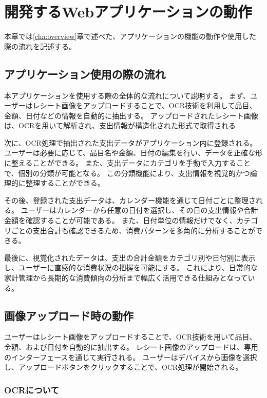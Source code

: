 \documentclass[main]{subfiles}
\begin{document}
\chapter{開発するWebアプリケーションの動作}
\label{cha:motion}
本章では\ref{cha:overview}章で述べた、アプリケーションの機能の動作や使用した際の流れを記述する。

\section{アプリケーション使用の際の流れ}

本アプリケーションを使用する際の全体的な流れについて説明する。
まず、ユーザーはレシート画像をアップロードすることで、OCR技術を利用して品目、金額、日付などの情報を自動的に抽出する。
アップロードされたレシート画像は、OCRを用いて解析され、支出情報が構造化された形式で取得される

次に、OCR処理で抽出された支出データがアプリケーション内に登録される。
ユーザーは必要に応じて、品目名や金額、日付の編集を行い、データを正確な形に整えることができる。
また、支出データにカテゴリを手動で入力することで、個別の分類が可能となる。
この分類機能により、支出情報を視覚的かつ論理的に整理することができる。

その後、登録された支出データは、カレンダー機能を通じて日付ごとに整理される。
ユーザーはカレンダーから任意の日付を選択し、その日の支出情報や合計金額を確認することが可能である。
また、日付単位の情報だけでなく、カテゴリごとの支出合計も確認できるため、消費パターンを多角的に分析することができる。

最後に、視覚化されたデータは、支出の合計金額をカテゴリ別や日付別に表示し、ユーザーに直感的な消費状況の把握を可能にする。
これにより、日常的な家計管理から長期的な消費傾向の分析まで幅広く活用できる仕組みとなっている。

\section{画像アップロード時の動作}

ユーザーはレシート画像をアップロードすることで、OCR技術を用いて品目、金額、および日付を自動的に抽出する。
レシート画像のアップロードは、専用のインターフェースを通じて実行される。
ユーザーはデバイスから画像を選択し、アップロードボタンをクリックすることで、OCR処理が開始される。

\subsection{OCRについて}
\end{document}
